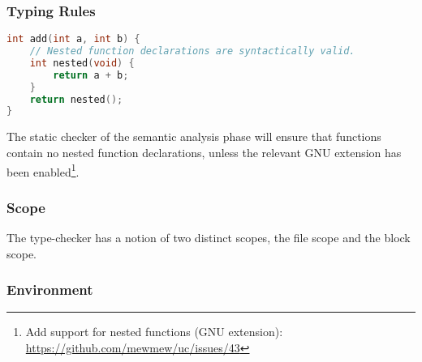 \subsubsection{Typing Rules}

\begin{lstlisting}[language=C,style=c,caption={\label{fig:nested_func_decl}Nested function declarations.}]
int add(int a, int b) {
	// Nested function declarations are syntactically valid.
	int nested(void) {
		return a + b;
	}
	return nested();
}
\end{lstlisting}

The static checker of the semantic analysis phase will ensure that functions contain no nested function declarations, unless the relevant GNU extension has been enabled\footnote{Add support for nested functions (GNU extension): \url{https://github.com/mewmew/uc/issues/43}}.

\subsubsection{Scope}
\label{sec:scope}

The type-checker has a notion of two distinct scopes, the file scope and the block scope.


\subsubsection{Environment}
